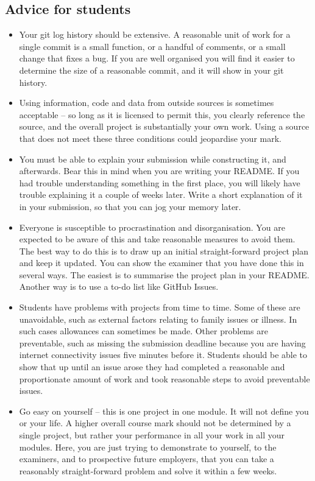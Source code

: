 \documentclass[12pt, a4paper]{article}
\begin{document}
\subsection*{Advice for students}
\begin{itemize}
    \item
    Your git log history should be extensive.
    A reasonable unit of work for a single commit is a small function, or a handful of comments, or a small change that fixes a bug.
    If you are well organised you will find it easier to determine the size of a reasonable commit, and it will show in your git history.
    \item
    Using information, code and data from outside sources is sometimes acceptable -- so long as it is licensed to permit this, you clearly reference the source, and the overall project is substantially your own work.
    Using a source that does not meet these three conditions could jeopardise your mark.
    \item
    You must be able to explain your submission while constructing it, and afterwards.
    Bear this in mind when you are writing your README.
    If you had trouble understanding something in the first place, you will likely have trouble explaining it a couple of weeks later.
    Write a short explanation of it in your submission, so that you can jog your memory later.
    \item
    Everyone is susceptible to procrastination and disorganisation.
    You are expected to be aware of this and take reasonable measures to avoid them.
    The best way to do this is to draw up an initial straight-forward project plan and keep it updated.
    You can show the examiner that you have done this in several ways.
    The easiest is to summarise the project plan in your README.
    Another way is to use a to-do list like GitHub Issues.
    \item
    Students have problems with projects from time to time.
    Some of these are unavoidable, such as external factors relating to family issues or illness.
    In such cases allowances can sometimes be made.
    Other problems are preventable, such as missing the submission deadline because you are having internet connectivity issues five minutes before it.
    Students should be able to show that up until an issue arose they had completed a reasonable and proportionate amount of work and took reasonable steps to avoid preventable issues.
    \item
    Go easy on yourself -- this is one project in one module.
    It will not define you or your life.
    A higher overall course mark should not be determined by a single project, but rather your performance in all your work in all your modules.
    Here, you are just trying to demonstrate to yourself, to the examiners, and to prospective future employers, that you can take a reasonably straight-forward problem and solve it within a few weeks.
\end{itemize}




\end{document}
